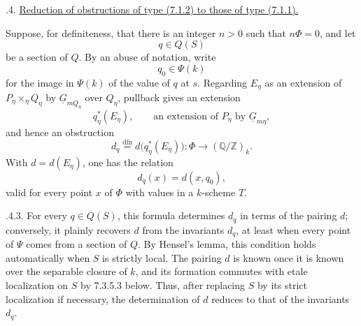 
\medskip
{}.4.  \underline{Reduction of obstructions of type (7.1.2) to
those of type (7.1.1).}

Suppose, for definiteness, that there is an integer $n>0$ such that
$n\Phi=0$, and let
\[
 q\in Q(S)
\]
be a section of $Q$.  By an abuse of notation, write
\[
 q_0\in\Psi(k)
\]
for the image in $\Psi(k)$ of the value of $q$ at $s$.  Regarding $E_\eta$
as an extension of $P_\eta\times_\eta Q_\eta$ by
$\underline G_{mQ_\eta}$ over $Q_\eta$, pullback gives an extension
\[
 q_\eta^*(E_\eta),\qquad
 \text{an extension of $P_\eta$ by $\underline G_{m\eta}$},
\]
and hence an obstruction
\begin{equation}\tag{7.3.4.1}
 d_q\overset{\mathrm{dfn}}{=}
 d\bigl(q_\eta^*(E_\eta)\bigr):
 \Phi\longrightarrow(\mathbb Q/\mathbb Z)_k.
\end{equation}
With $d=d(E_\eta)$, one has the relation
\begin{equation}\tag{7.3.4.2}
 d_q(x)=d(x,q_0),
\end{equation}
valid for every point $x$ of $\Phi$ with values in a $k$-scheme $T$.

\smallskip
{}.4.3.  For every $q\in Q(S)$, this formula determines $d_q$
in terms of the pairing $d$; conversely, it plainly recovers $d$ from the
invariants $d_q$, at least when every point of $\Psi$ comes from a section
of $Q$.  By Hensel's lemma, this condition holds automatically when $S$ is
strictly local.  The pairing $d$ is known once it is known over the
separable closure of $k$, and its formation commutes with etale localization
on $S$ by 7.3.5.3 below.  Thus, after replacing $S$ by its strict
localization if necessary, the determination of $d$ reduces to that of the
invariants $d_q$.

